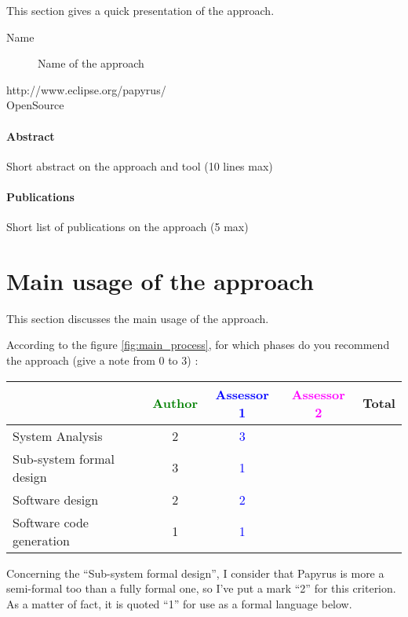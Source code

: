 This section gives a quick presentation of the approach.

\begin{description}
\item[Name] Name of the approach
\item[http://www.eclipse.org/papyrus/]
\item[OpenSource] 
\end{description}

\paragraph{Abstract} Short abstract on the approach and tool (10 lines max)

\paragraph{Publications} Short list of publications on the approach (5 max)


\section{Main usage of the approach}
\label{main_usage}
This section discusses the main usage of the approach.

According to the figure \ref{fig:main_process}, for which phases do you recommend the approach (give a note from 0 to 3) :

\begin{tabular}{|l | c | c | c | c|}
\hline
& \textcolor{green}{Author} & \textcolor{blue}{Assessor 1} & \textcolor{magenta}{Assessor 2} & Total \\
\hline
System Analysis & 2 & \textcolor{blue}{3} & & \\
\hline
Sub-system formal design & 3 & \textcolor{blue}{1} & & \\
\hline
Software design & 2 & \textcolor{blue}{2} & & \\
\hline
Software code generation & 1 & \textcolor{blue}{1} & & \\
\hline
\end{tabular}

\begin{assessor1}
Concerning the "`Sub-system formal design"', I consider that Papyrus is more a semi-formal too than a fully formal one, so I've put a mark "`2"' for this criterion. 
As a matter of fact, it is quoted "`1"' for use as a formal language below. 
\end{assessor1}

